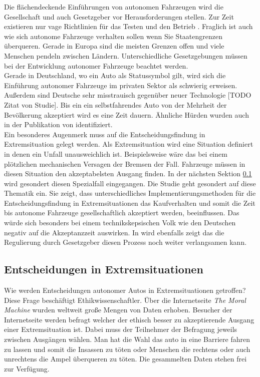 Die flächendeckende Einführungen von autonomen Fahrzeugen wird die Gesellschaft und auch Gesetzgeber vor Herausforderungen stellen. Zur Zeit existieren nur vage Richtlinien für das Testen und den Betrieb \cite{doi:10.1080/01441647.2018.1494640}. Fraglich ist auch wie sich autonome Fahrzeuge verhalten sollen wenn Sie Staatengrenzen überqueren. Gerade in Europa sind die meisten Grenzen offen und viele Menschen pendeln zwischen Ländern. Unterschiedliche Gesetzgebungen müssen bei der Entwicklung autonomer Fahrzeuge beachtet werden.\\

Gerade in Deutschland, wo ein Auto als Statussymbol gilt, wird sich die Einführung autonomer Fahrzeuge im privaten Sektor als schwierig erweisen. Außerdem sind Deutsche sehr misstrauisch gegenüber neuer Technologie [TODO Zitat von Studie]. Bis ein ein selbstfahrendes Auto von der Mehrheit der Bevölkerung akzeptiert wird es eine Zeit dauern. Ähnliche Hürden wurden auch in der Publikation \cite{roadblocks} von \citeauthor{roadblocks} identifiziert.\\

Ein besonderes Augenmerk muss auf die Entscheidungsfindung in Extremsituation gelegt werden. Als Extremsituation wird eine Situation definiert in denen ein Unfall unausweichlich ist. Beispielsweise wäre das bei einem plötzlichen mechanischen Versagen der Bremsen der Fall. Fahrzeuge müssen in diesen Situation den akzeptabelsten Ausgang finden. In der nächsten Sektion \ref{ssec:entscheidungen-in-extremsituationen} wird gesondert diesen Spezialfall eingegangen. Die Studie \cite{socialDilemma} geht gesondert auf diese Thematik ein. Sie zeigt, dass unterschiedliches Implementierungsmethoden für die Entscheidungsfindung in Extremsituationen das Kaufverhalten und somit die Zeit bis autonome Fahrzeuge gesellschaftlich akzeptiert werden, beeinflussen. Das würde sich besonders bei einem technikskepsischen Volk wie den Deutschen negativ auf die Akzeptanzzeit auswirken. In \citeauthor{socialDilemma} wird ebenfalls zeigt das die Regulierung durch Gesetzgeber diesen Prozess noch weiter verlangsamen kann.\\


\subsection{Entscheidungen in Extremsituationen}
\label{ssec:entscheidungen-in-extremsituationen}

Wie werden Entscheidungen autonomer Autos in Extremsituationen getroffen? Diese Frage beschäftigt Ethikwissenschaftler. Über die Internetseite \textit{The Moral Machine} wurden weltweit große Mengen von Daten erhoben. Besucher der Internetseite werden befragt welcher der ethisch besser zu akzeptierende Ausgang einer Extremsituation ist. Dabei muss der Teilnehmer der Befragung jeweils zwischen Ausgängen wählen. Man hat die Wahl das auto in eine Barriere fahren zu lassen und somit die Insassen zu töten oder Menschen die rechtens oder auch unrechtens die Ampel überqueren zu töten. Die gesammelten Daten stehen frei zur Verfügung. 

